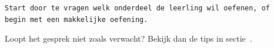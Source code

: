 \documentclass{ximera}
\begin{document}
{\begin{verbatim}
Start door te vragen welk onderdeel de leerling wil oefenen, of
begin met een makkelijke oefening.
\end{verbatim}
}

Loopt het gesprek niet zoals verwacht? Bekijk dan de tips in sectie~.
\end{document}
